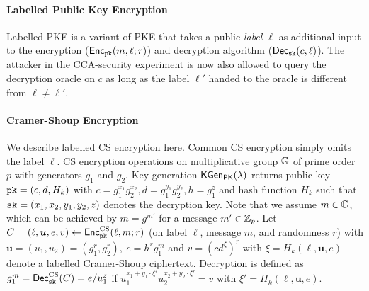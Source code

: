 \paragraph{Labelled Public Key Encryption}
Labelled \ac{PKE} \cite{Shoup01,Canetti2005} is a variant of \ac{PKE} that takes a public \emph{label $\ell$} as additional input to the encryption ($\mathsf{Enc}_\mathtt{pk}(m,\ell; r)$) and decryption algorithm ($\mathsf{Dec}_\mathtt{sk}(c,\ell)$).
The attacker in the \ac{CCA}-security experiment is now also allowed to query the decryption oracle on $c$ as long as the label $\ell'$ handed to the oracle is different from $\ell\not=\ell'$.


\paragraph{Cramer-Shoup Encryption}\label{sec:csencryption}

We describe labelled \ac{CS} encryption here.
Common \ac{CS} encryption simply omits the label $\ell$.
\ac{CS} encryption operations on multiplicative group $\mathbb{G}$ of prime order $p$ with generators $g_1$ and $g_2$.
Key generation $\mathsf{KGen_{PK}}(\lambda)$ returns public key $\mathtt{pk}=(c,d,H_k)$ with $c=g_{1}^{x_1}g_{2}^{x_2}, d=g_{1}^{y_1}g_{2}^{y_2}, h=g_{1}^z$ and hash function $H_k$ such that $\mathtt{sk}=(x_1,x_2,y_1,y_2,z)$ denotes the decryption key.
Note that we assume $m\in\mathbb{G}$, which can be achieved by $m=g^{m'}$ for a message $m'\in\mathbb{Z}_p$.
Let $C=(\ell,\bm{u},e,v)\gets\mathsf{Enc}^{\mathrm{CS}}_\mathtt{pk}(\ell,m;r)$ (on label $\ell$, message $m$, and randomness $r$) with $\bm{u}=(u_1,u_2)=(g_{1}^r,g_{2}^r),~ e=h^rg_1^m$ and $v=(cd^{\xi})^r$ with $\xi=H_k(\ell,\bm{u},e)$ denote a labelled Cramer-Shoup ciphertext.
Decryption is defined as $g_1^m=\mathsf{Dec}_\mathtt{sk}^\mathrm{CS}(C)=e/u_1^z$ if $u_1^{x_1+y_1\cdot \xi'}u_2^{x_2+y_2\cdot \xi'}=v$ with $\xi'=H_k(\ell,\bm{u},e)$.

